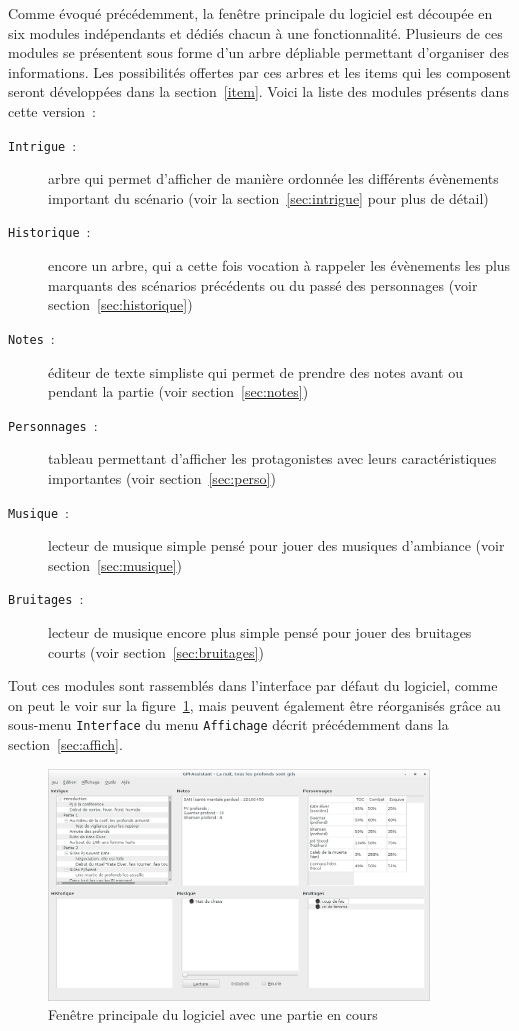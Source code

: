 \documentclass[a4paper,12pt]{article}
\newcommand*{\interfaceitem}[1]{\texttt{#1}}
\newcommand*{\guillemets}[1]{\og #1\fg{}\xspace}
\begin{document}
Comme évoqué précédemment, la fenêtre principale du logiciel est découpée en six modules indépendants et dédiés chacun à une fonctionnalité.
Plusieurs de ces modules se présentent sous forme d'un arbre \guillemets{dépliable} permettant d'organiser des informations.
Les possibilités offertes par ces arbres et les items qui les composent seront développées dans la section~\ref{item}.
Voici la liste des modules présents dans cette version~:
\begin{description}
    \item[\interfaceitem{Intrigue}~:]{arbre qui permet d'afficher de manière ordonnée les différents évènements important du scénario (voir la section~\ref{sec:intrigue} pour plus de détail)}
    \item[\interfaceitem{Historique}~:]{encore un arbre, qui a cette fois vocation à rappeler les évènements les plus marquants des scénarios précédents ou du passé des personnages (voir section~\ref{sec:historique})}
    \item[\interfaceitem{Notes}~:]{éditeur de texte simpliste qui permet de prendre des notes avant ou pendant la partie (voir section~\ref{sec:notes})}
    \item[\interfaceitem{Personnages}~:]{tableau permettant d'afficher les protagonistes avec leurs caractéristiques importantes (voir section~\ref{sec:perso})}
    \item[\interfaceitem{Musique}~:]{lecteur de musique simple pensé pour jouer des musiques d'ambiance (voir section~\ref{sec:musique})}
    \item[\interfaceitem{Bruitages}~:]{lecteur de musique encore plus simple pensé pour jouer des bruitages courts (voir section~\ref{sec:bruitages})}
\end{description}
Tout ces modules sont rassemblés dans l'interface par défaut du logiciel, comme on peut le voir sur la figure~\ref{fig:interface}, mais peuvent également être réorganisés grâce au sous-menu \interfaceitem{Interface} du menu \interfaceitem{Affichage} décrit précédemment dans la section~\ref{sec:affich}.
\begin{figure}[ht]
    \centerline{\includegraphics[width=0.9\textwidth]{scenario_complet}}
    \caption{Fenêtre principale du logiciel avec une partie en cours}
    \label{fig:interface}
\end{figure}
\end{document}
